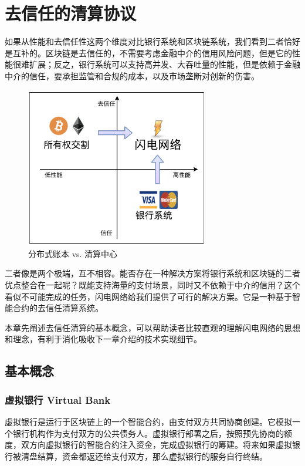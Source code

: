 \section{去信任的清算协议}\label{sec:clearing}

如果从性能和去信任性这两个维度对比银行系统和区块链系统，我们看到二者恰好是互补的。区块链是去信任的，不需要考虑金融中介的信用风险问题，但是它的性能很难扩展；反之，银行系统可以支持高并发、大吞吐量的性能，但是依赖于金融中介的信任，要承担监管和合规的成本，以及市场垄断对创新的伤害。

\begin{figure}[h!]
    \centering
    \includegraphics[width=8cm, keepaspectratio]{../images/comparision_1.png}
    \caption{分布式账本 vs. 清算中心}
    \label{fig:comparition}
\end{figure}


二者像是两个极端，互不相容。能否存在一种解决方案将银行系统和区块链的二者优点整合在一起呢？既能支持海量的支付场景，同时又不依赖于中介的信用？这个看似不可能完成的任务，闪电网络给我们提供了可行的解决方案。它是一种基于智能合约的去信任清算系统。

本章先阐述去信任清算的基本概念，可以帮助读者比较直观的理解闪电网络的思想和理念，有利于消化吸收下一章介绍的技术实现细节。

\subsection{基本概念}

\subsubsection{虚拟银行 Virtual Bank}
虚拟银行是运行于区块链上的一个智能合约，由支付双方共同协商创建。它模拟一个银行机构作为支付双方的公共债务人。虚拟银行部署之后，按照预先协商的额度，双方向虚拟银行的智能合约注入资金，完成虚拟银行的筹建。将来如果虚拟银行被清盘结算，资金都返还给支付双方，那么虚拟银行的服务自行终结。


